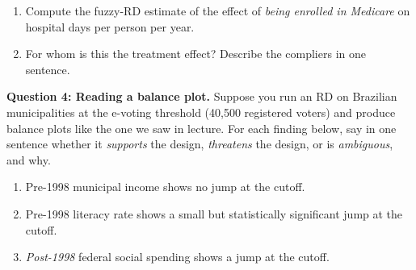 \documentclass[11pt]{article}
\begin{document}
\medskip
\begin{enumerate}[label=(\alph*), itemsep=0.5em]
\item Compute the fuzzy-RD estimate of the effect of \emph{being enrolled in Medicare} on hospital days per person per year.

\vspace{1.8cm}

\item For whom is this the treatment effect?  Describe the compliers in one sentence.

\vspace{1.8cm}


\end{enumerate}

\noindent\textbf{Question 4: Reading a balance plot.}  Suppose you run an RD on Brazilian municipalities at the e-voting threshold (40{,}500 registered voters) and produce balance plots like the one we saw in lecture.  For each finding below, say in one sentence whether it \emph{supports} the design, \emph{threatens} the design, or is \emph{ambiguous}, and why.

\medskip
\begin{enumerate}[label=(\alph*), itemsep=0.5em]
\item Pre-1998 municipal income shows no jump at the cutoff.

\vspace{1.6cm}

\item Pre-1998 literacy rate shows a small but statistically significant jump at the cutoff.

\vspace{1.6cm}

\item \emph{Post-1998} federal social spending shows a jump at the cutoff.

\vspace{1.6cm}
\end{enumerate}
\end{document}
